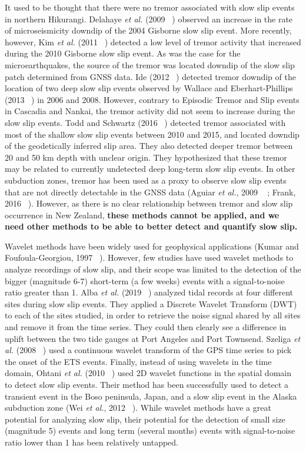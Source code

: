 \documentclass[draft]{agujournal2018}
\begin{document}
It used to be thought that there were no tremor associated with slow slip events in northern Hikurangi. Delahaye \textit{et al.} (2009 ~\cite{DEL_2009}) observed an increase in the rate of microseismicity downdip of the 2004 Gisborne slow slip event. More recently, however, Kim \textit{et al.} (2011 ~\cite{KIM_2011}) detected a low level of tremor activity that increased during the 2010 Gisborne slow slip event. As was the case for the microearthquakes, the source of the tremor was located downdip of the slow slip patch determined from GNSS data. Ide (2012 ~\cite{IDE_2012}) detected tremor downdip of the location of two deep slow slip events observed by Wallace and Eberhart-Phillips (2013 ~\cite{WAL_2013}) in 2006 and 2008. However, contrary to Episodic Tremor and Slip events in Cascadia and Nankai, the tremor activity did not seem to increase during the slow slip events. Todd and Schwartz (2016 ~\cite{TOD_2016}) detected tremor associated with most of the shallow slow slip events between 2010 and 2015, and located downdip of the geodetically inferred slip area. They also detected deeper tremor between 20 and 50 km depth with unclear origin. They hypothesized that these tremor may be related to currently undetected deep long-term slow slip events. In other subduction zones, tremor has been used as a proxy to observe slow slip events that are not directly detectable in the GNSS data (Aguiar \textit{et al.}, 2009 ~\cite{AGU_2009} ; Frank, 2016 ~\cite{FRA_2016}). However, as there is no clear relationship between tremor and slow slip occurrence in New Zealand, \textbf{these methods cannot be applied, and we need other methods to be able to better detect and quantify slow slip.}

Wavelet methods have been widely used for geophysical applications (Kumar and Foufoula-Georgiou, 1997 ~\cite{KUM_1997}). However, few studies have used wavelet methods to analyze recordings of slow slip, and their scope was limited to the detection of the bigger (magnitude 6-7) short-term (a few weeks) events with a signal-to-noise ratio greater than 1. Alba \textit{et al.} (2019 ~\cite{ALB_2019}) analyzed tidal records at four different sites during slow slip events. They applied a Discrete Wavelet Transform (DWT) to each of the sites studied, in order to retrieve the noise signal shared by all sites and remove it from the time series. They could then clearly see a difference in uplift between the two tide gauges at Port Angeles and Port Townsend. Szeliga \textit{et al.} (2008 ~\cite{SZE_2008}) used a continuous wavelet transform of the GPS time series to pick the onset of the ETS events. Finally, instead of using wavelets in the time domain, Ohtani \textit{et al.} (2010 ~\cite{OHT_2010}) used 2D wavelet functions in the spatial domain to detect slow slip events. Their method has been successfully used to detect a transient event in the Boso peninsula, Japan, and a slow slip event in the Alaska subduction zone (Wei \textit{et al.}, 2012 ~\cite{WEI_2012}). While wavelet methods have a great potential for analyzing slow slip, their potential for the detection of small size (magnitude 5) events and long term (several months) events with signal-to-noise ratio lower than 1 has been relatively untapped. 
\end{document}
